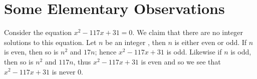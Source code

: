 
\section{Some Elementary Observations} \hspace{10mm}

Consider the equation $x^2-117x+31=0$. We claim that there are no integer solutions to this equation. Let $n$ be an integer
, then $n$ is either even or odd. If $n$ is even, then so is  $n^2$ and  $17n$; hence $x^2-117x+31$ is odd. Likewise if $n$ 
is odd, then so is $n^2$ and  $117n$, thus $x^2-117x+31$ is even and so we see that $x^2-117x+31$ is never $0$.  
